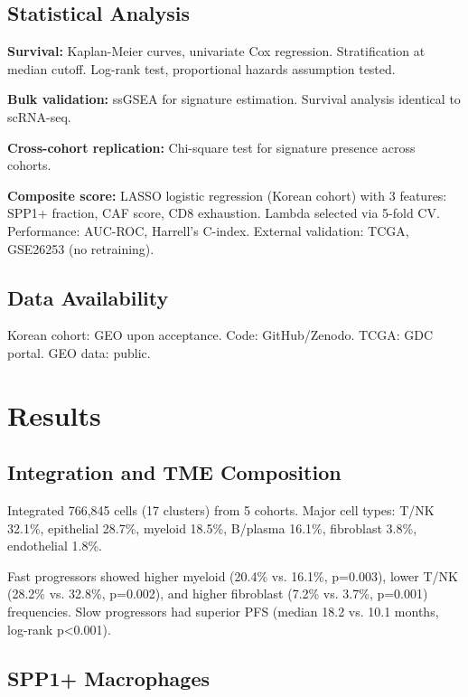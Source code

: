 \documentclass[12pt,twoside]{article}
\begin{document}
\subsection{Statistical Analysis}

\textbf{Survival:} Kaplan-Meier curves, univariate Cox regression. Stratification at median cutoff. Log-rank test, proportional hazards assumption tested.

\textbf{Bulk validation:} ssGSEA for signature estimation. Survival analysis identical to scRNA-seq.

\textbf{Cross-cohort replication:} Chi-square test for signature presence across cohorts.

\textbf{Composite score:} LASSO logistic regression (Korean cohort) with 3 features: SPP1+ fraction, CAF score, CD8 exhaustion. Lambda selected via 5-fold CV. Performance: AUC-ROC, Harrell's C-index. External validation: TCGA, GSE26253 (no retraining).

\subsection{Data Availability}

Korean cohort: GEO upon acceptance. Code: GitHub/Zenodo. TCGA: GDC portal. GEO data: public.


\section{Results}

\subsection{Integration and TME Composition}

Integrated 766,845 cells (17 clusters) from 5 cohorts. Major cell types: T/NK 32.1\%, epithelial 28.7\%, myeloid 18.5\%, B/plasma 16.1\%, fibroblast 3.8\%, endothelial 1.8\%.

Fast progressors showed higher myeloid (20.4\% vs. 16.1\%, p=0.003), lower T/NK (28.2\% vs. 32.8\%, p=0.002), and higher fibroblast (7.2\% vs. 3.7\%, p=0.001) frequencies. Slow progressors had superior PFS (median 18.2 vs. 10.1 months, log-rank p<0.001).

\subsection{SPP1+ Macrophages}
\end{document}
